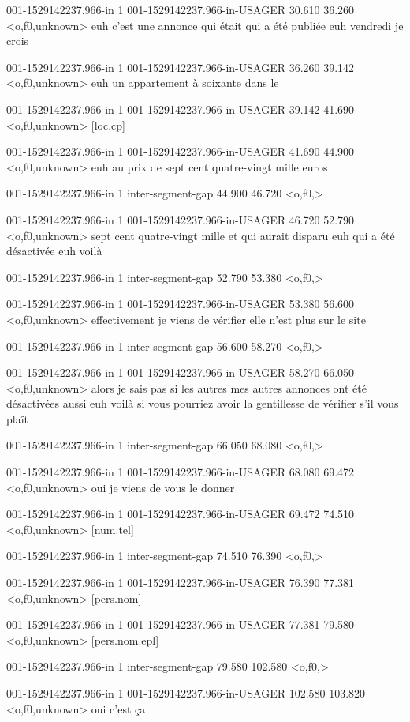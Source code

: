 001-1529142237.966-in 1 001-1529142237.966-in-USAGER 30.610 36.260 <o,f0,unknown> euh c'est une annonce qui était qui a été publiée euh vendredi je crois

001-1529142237.966-in 1 001-1529142237.966-in-USAGER 36.260 39.142 <o,f0,unknown> euh un appartement à soixante dans le

001-1529142237.966-in 1 001-1529142237.966-in-USAGER 39.142 41.690 <o,f0,unknown> [loc.cp]

001-1529142237.966-in 1 001-1529142237.966-in-USAGER 41.690 44.900 <o,f0,unknown> euh au prix de sept cent quatre-vingt mille euros

001-1529142237.966-in 1 inter-segment-gap 44.900 46.720 <o,f0,>

001-1529142237.966-in 1 001-1529142237.966-in-USAGER 46.720 52.790 <o,f0,unknown> sept cent quatre-vingt mille et qui aurait disparu euh qui a été désactivée euh voilà

001-1529142237.966-in 1 inter-segment-gap 52.790 53.380 <o,f0,>

001-1529142237.966-in 1 001-1529142237.966-in-USAGER 53.380 56.600 <o,f0,unknown> effectivement je viens de vérifier elle n'est plus sur le site

001-1529142237.966-in 1 inter-segment-gap 56.600 58.270 <o,f0,>

001-1529142237.966-in 1 001-1529142237.966-in-USAGER 58.270 66.050 <o,f0,unknown> alors je sais pas si les autres mes autres annonces ont été désactivées aussi euh voilà si vous pourriez avoir la gentillesse de vérifier s'il vous plaît

001-1529142237.966-in 1 inter-segment-gap 66.050 68.080 <o,f0,>

001-1529142237.966-in 1 001-1529142237.966-in-USAGER 68.080 69.472 <o,f0,unknown> oui je viens de vous le donner

001-1529142237.966-in 1 001-1529142237.966-in-USAGER 69.472 74.510 <o,f0,unknown> [num.tel]

001-1529142237.966-in 1 inter-segment-gap 74.510 76.390 <o,f0,>

001-1529142237.966-in 1 001-1529142237.966-in-USAGER 76.390 77.381 <o,f0,unknown> [pers.nom]

001-1529142237.966-in 1 001-1529142237.966-in-USAGER 77.381 79.580 <o,f0,unknown> [pers.nom.epl]

001-1529142237.966-in 1 inter-segment-gap 79.580 102.580 <o,f0,>

001-1529142237.966-in 1 001-1529142237.966-in-USAGER 102.580 103.820 <o,f0,unknown> oui c'est ça

